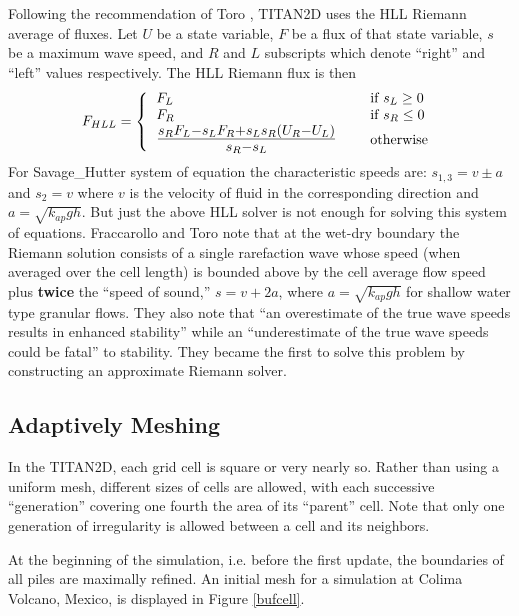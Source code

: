\documentclass[letterpaper,10pt]{article}
\begin{document}
Following the recommendation of Toro \cite{ToroBook2001}, TITAN2D uses 
the HLL Riemann average of fluxes. Let $U$ be a state variable, $F$ 
be a flux of that state variable, $s$ be a maximum wave speed, 
and $R$ and $L$ subscripts which denote ``right'' and ``left'' values 
respectively.  The HLL Riemann flux is then
\begin{equation}
F_{HLL}=\left\{\begin{tabular}{lll}$F_L$&\hspace{0.5 truein}& if $s_L\ge 0$\\$F_R$&& if $s_R\le 0$\\{\Large 
$\frac{s_RF_L-s_LF_R+s_Ls_R(U_R-U_L)}{s_R-s_L}$}&& otherwise\end{tabular} \right.
\end{equation}
For Savage\_Hutter system of equation the characteristic speeds are: $s_{1,3}=v\pm a$ and $s_2=v$ where $v$ is the 
velocity of fluid in the corresponding direction and $a=\sqrt{k_{ap}gh}$.
But just the above HLL solver is not enough for solving this system of equations.
Fraccarollo and Toro \cite{FraccarolloToro1995} note that at the 
wet-dry boundary the Riemann solution consists of a single rarefaction 
wave whose speed (when averaged over the cell length) 
is bounded above by the cell average flow speed plus 
{\bf twice} the ``speed of sound,'' $s=v+2a$, where $a=\sqrt{k_{ap}gh}$ 
for shallow water type granular flows.  They also note that ``an overestimate 
of the true wave speeds results in enhanced stability'' while an 
``underestimate of the true wave speeds could be fatal'' to stability.
They became the first to 
solve this problem by constructing an approximate Riemann solver.\newline

\subsection{Adaptively Meshing} \label{adaptivemeshing}
In the TITAN2D, each grid cell is square or very nearly so.  Rather than 
using a uniform mesh, different sizes of cells are allowed, with each 
successive ``generation'' covering one fourth the area of its ``parent'' 
cell.  Note that only one generation of irregularity is allowed between 
a cell and its neighbors.\newline

At the beginning of the simulation, i.e. before the first update, the 
boundaries of all piles are maximally refined. An initial mesh for a 
simulation at Colima Volcano, Mexico, is displayed in Figure \ref{bufcell}. 
\end{document}
